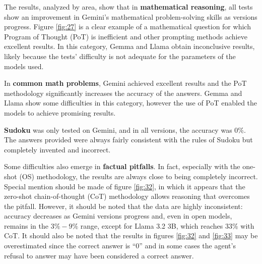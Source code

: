 \documentclass[12pt]{article}
\begin{document}


The results, analyzed by area, show that in \textbf{mathematical reasoning}, all tests show an improvement in Gemini's mathematical problem-solving skills as versions progress. 
Figure \ref{fig:27} is a clear example of a mathematical question for which Program of Thought (PoT) is inefficient and other prompting methods achieve excellent results.
In this category, Gemma and Llama obtain inconclusive results, likely  because the tests' difficulty is not adequate for the parameters of the models used.

In \textbf{common math problems}, Gemini achieved excellent results and the PoT methodology significantly increases the accuracy of the answers. Gemma and Llama show some difficulties in this category, however the use of PoT enabled the models to achieve promising results.

\textbf{Sudoku} was only tested on Gemini, and in all versions, the accuracy was 0\%. The answers provided were always fairly consistent with the rules of Sudoku but completely invented and incorrect.

Some difficulties also emerge in \textbf{factual pitfalls}. In fact, especially with the one-shot (OS) methodology, the results are always close to being completely incorrect. Special mention should be made of figure \ref{fig:32}, in which it appears that the zero-shot chain-of-thought (CoT) methodology allows reasoning that overcomes the pitfall. However, it should be noted that the data are highly inconsistent: accuracy decreases as Gemini versions progress and, even in open models, remains in the $3\%-9\%$ range, except for Llama 3.2 3B, which reaches 33\% with CoT.
It should also be noted that the results in figures \ref{fig:32} and \ref{fig:33} may be overestimated since the correct answer is ``0'' and in some cases the agent's refusal to answer may have been considered a correct answer.
\end{document}
